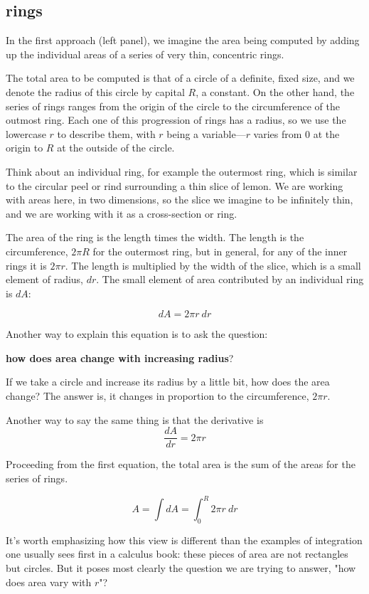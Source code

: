 \documentclass[11pt, oneside]{report}   	%
\begin{document}
\subsection*{rings}

In the first approach (left panel), we imagine the area being computed by adding up the individual areas of a series of very thin, concentric rings.

The total area to be computed is that of a circle of a definite, fixed size, and we denote the radius of this circle by capital $R$, a constant.  On the other hand, the series of rings ranges from the origin of the circle to the circumference of the outmost ring.  Each one of this progression of rings has a radius, so we use the lowercase $r$ to describe them, with $r$ being a variable---$r$ varies from $0$ at the origin to $R$ at the outside of the circle.

Think about an individual ring, for example the outermost ring, which is similar to the circular peel or rind surrounding a thin slice of lemon.  We are working with areas here, in two dimensions, so the slice we imagine to be infinitely thin, and we are working with it as a cross-section or ring.

The area of the ring is the length times the width.  The length is the circumference, $2 \pi R$ for the outermost ring, but in general, for any of the inner rings it is $2 \pi r$. The length is multiplied by the width of the slice, which is a small element of radius, $dr$.  The small element of area contributed by an individual ring is $dA$:

\[ dA = 2 \pi r \ dr \]

Another way to explain this equation is to ask the question:

\textbf{how does area change with increasing radius}?  

If we take a circle and increase its radius by a little bit, how does the area change?  The answer is, it changes in proportion to the circumference, $2 \pi r$.

Another way to say the same thing is that the derivative is
\[ \frac{dA}{dr} = 2 \pi r \]

Proceeding from the first equation, the total area is the sum of the areas for the series of rings.

\[ A = \int dA = \int_0^R 2 \pi r \ dr \]

It's worth emphasizing how this view is different than the examples of integration one usually sees first in a calculus book:  these pieces of area are not rectangles but circles.  But it poses most clearly the question we are trying to answer, "how does area vary with $r$"?
\end{document}
